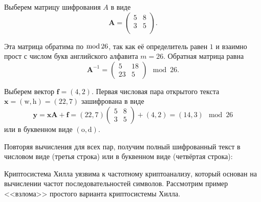 Выберем матрицу шифрования $A$ в виде
\[
    \mathbf{A} = \left( \begin{array}{cc}
        5 & 8 \\
        3 & 5 \\
    \end{array} \right).
\]

Эта матрица обратима по $\operatorname{mod} 26$, так как её определитель равен $1$ и взаимно прост с числом букв английского алфавита $m=26$. Обратная матрица равна
\[
    \mathbf{A}^{-1} = \left( \begin{array}{cc}
        5  & 18 \\
        23 & 5
    \end{array} \right) \mod 26.
\]

Выберем вектор $\mathbf{f} = (4, 2)$. Первая числовая пара открытого текста $\mathbf{x} = (\text{w}, \text{h}) = (22, 7)$ зашифрована в виде
\[
    \mathbf{y} = \mathbf{x} \mathbf{A} + \mathbf{f} =
        (22, 7)
        \left( \begin{array}{cc}
            5 & 8 \\
            3 & 5
        \end{array} \right) +
        (4, 2) = (14, 3) \mod 26
\]
или в буквенном виде $(\text{o}, \text{d})$.

Повторяя вычисления для всех пар, получим полный шифрованный текст в числовом виде (третья строка) или в буквенном виде (четвёртая строка):
\begin{center}  \end{center}
\exampleend

Криптосистема Хилла уязвима к частотному криптоанализу, который основан на вычислении частот последовательностей символов. Рассмотрим пример <<взлома>> простого варианта криптосистемы Хилла.

